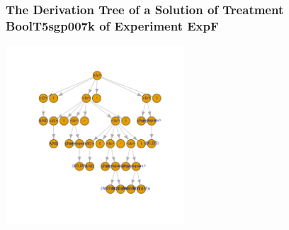  \begin{frame}
 \frametitle{ The Derivation Tree of a Solution of Treatment BoolT5sgp007k of Experiment ExpF }
 \begin{center}
\includegraphics[width=0.5\textwidth, angle=0]
{ExpFDerivationTreeFigure005.pdf}
 \end{center}
 \label{templateReport/ExpFDerivationTreeFigure005.pdf}  
 \end{frame}


